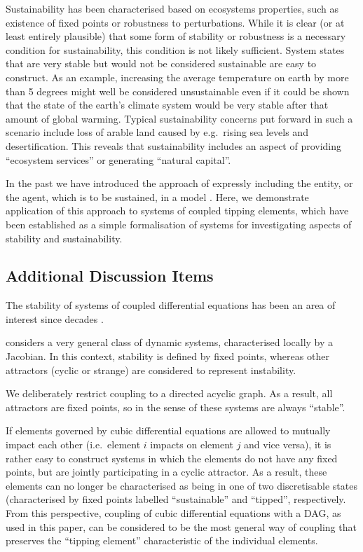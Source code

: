 \documentclass[conference]{IEEEtran}
\begin{document}
Sustainability has been characterised based on ecosystems properties,
such as existence of fixed points or robustness to perturbations.
While it is clear (or at least entirely plausible) that some form of
stability or robustness is a necessary condition for sustainability,
this condition is not likely sufficient. System states that are very
stable but would not be considered sustainable are easy to construct.
As an example, increasing the average temperature on earth by more
than 5 degrees might well be considered unsustainable even if it could
be shown that the state of the earth's climate system would be very
stable after that amount of global warming. Typical sustainability
concerns put forward in such a scenario include loss of arable land
caused by e.g.\ rising sea levels and desertification. This reveals
that sustainability includes an aspect of providing ``ecosystem
services'' or generating ``natural capital''.

In the past we have introduced the approach of expressly including the
entity, or the agent, which is to be sustained, in a model
\cite{Kim2009_sustainability}. Here, we demonstrate application of
this approach to systems of coupled tipping elements, which have been
established as a simple formalisation of systems for investigating
aspects of stability and sustainability.


\subsection{Additional Discussion Items}

The stability of systems of coupled differential equations has been an
area of interest since decades
\cite{May1972_stablelargecomplexsystem,Landi2018_ecologicalnetworks}.

\cite{May1972_stablelargecomplexsystem} considers a very general
class of dynamic systems, characterised locally by a Jacobian. In this
context, stability is defined by fixed points, whereas other
attractors (cyclic or strange) are considered to represent
instability.

We deliberately restrict coupling to a directed acyclic graph. As a
result, all attractors are fixed points, so in the sense of
\cite{May1972_stablelargecomplexsystem} these systems are always
``stable''.

If elements governed by cubic differential equations are allowed to
mutually impact each other (i.e.\ element $i$ impacts on element $j$
and vice versa), it is rather easy to construct systems in which the
elements do not have any fixed points, but are jointly participating
in a cyclic attractor. As a result, these elements can no longer be
characterised as being in one of two discretisable states
(characterised by fixed points labelled ``sustainable'' and
``tipped'', respectively. From this perspective, coupling of cubic
differential equations with a DAG, as used in this paper, can be
considered to be the most general way of coupling that preserves the
``tipping element'' characteristic of the individual elements.
\end{document}
